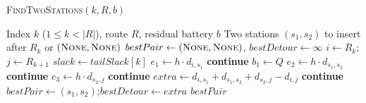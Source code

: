 \documentclass{article}
\begin{document}
\begin{algorithm}[H]
\caption{\textsc{FindTwoStations}$(k,R,b)$}
\label{alg:findtwostations}
\begin{algorithmic}[1]
\Require Index $k$ ($1\le k<|R|$), route $R$, residual battery $b$
\Ensure Two stations $(s_1, s_2)$ to insert after $R_k$ or $(\textsc{None}, \textsc{None})$
    \State $bestPair \gets (\textsc{None}, \textsc{None})$,\; $bestDetour \gets \infty$
    \State $i \gets R_k$;\quad $j \gets R_{k+1}$
    \State $\textit{slack} \gets \textit{tailSlack}[k]$
        \State $e_1 \gets h \cdot d_{i,s_1}$
         \textbf{continue} \EndIf
        \State $b_1 \gets Q$ 
            \State $e_2 \gets h \cdot d_{s_1,s_2}$
             \textbf{continue} \EndIf
            \State $e_3 \gets h \cdot d_{s_2,j}$
             \textbf{continue} \EndIf
            \State $extra \gets d_{i,s_1} + d_{s_1,s_2} + d_{s_2,j} - d_{i,j}$
             \textbf{continue} \EndIf
                \State $bestPair \gets (s_1, s_2)$;\quad $bestDetour \gets extra$
            \EndIf
        \EndFor
    \EndFor
    \State \Return $bestPair$
\EndFunction
\end{algorithmic}
\end{algorithm}
\end{document}
